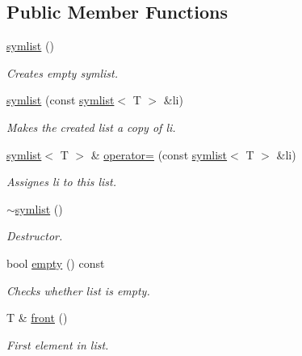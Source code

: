 \subsection*{Public Member Functions}
\begin{DoxyCompactItemize}
\item 
\mbox{\label{classsymlist_a678dc0ddb02994195a2359a361ee0ea6}} 
\mbox{\hyperlink{classsymlist_a678dc0ddb02994195a2359a361ee0ea6}{symlist}} ()
\begin{DoxyCompactList}\small\item\em Creates empty symlist. \end{DoxyCompactList}\item 
\mbox{\hyperlink{classsymlist_a5c17d54592dac03b2c4d940a10153797}{symlist}} (const \mbox{\hyperlink{classsymlist}{symlist}}$<$ T $>$ \&li)
\begin{DoxyCompactList}\small\item\em Makes the created list a copy of {\ttfamily li}. \end{DoxyCompactList}\item 
\mbox{\hyperlink{classsymlist}{symlist}}$<$ T $>$ \& \mbox{\hyperlink{classsymlist_aab326eda0f6d3a78f193a249342670bc}{operator=}} (const \mbox{\hyperlink{classsymlist}{symlist}}$<$ T $>$ \&li)
\begin{DoxyCompactList}\small\item\em Assignes {\ttfamily li} to this list. \end{DoxyCompactList}\item 
\mbox{\label{classsymlist_a45c3a0b7f0e996998037fb876effefd4}} 
\mbox{\hyperlink{classsymlist_a45c3a0b7f0e996998037fb876effefd4}{$\sim$symlist}} ()
\begin{DoxyCompactList}\small\item\em Destructor. \end{DoxyCompactList}\item 
bool \mbox{\hyperlink{classsymlist_aca11cd6c621376bc52a18828ef92e753}{empty}} () const
\begin{DoxyCompactList}\small\item\em Checks whether list is empty. \end{DoxyCompactList}\item 
T \& \mbox{\hyperlink{classsymlist_afd4b55616fc20033d4a47684551866e8}{front}} ()
\begin{DoxyCompactList}\small\item\em First element in list. \end{DoxyCompactList}\item 

\end{DoxyCompactItemize}
